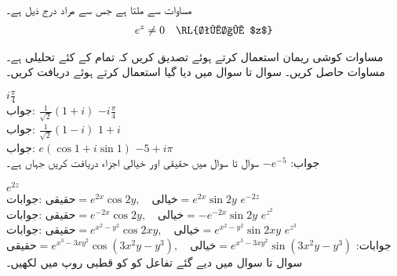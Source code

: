 مساوات  سے  ملتا ہے جس سے مراد درج ذیل ہے۔
\begin{align}
e^z\ne 0\quad \text{\RL{تمام $z$}}
\end{align}

\quad
مساوات کوشی ریمان استعمال کرتے ہوئے تصدیق کریں کہ  تمام  کے کئے تحلیلی ہے۔
\quad
مساوات  حاصل کریں۔
سوال  تا سوال  میں دیا گیا  استعمال کرتے ہوئے   دریافت کریں۔

\quad
$i\tfrac{\pi}{4}$\\
جواب:\quad
$\tfrac{1}{\sqrt{2}}(1+i)$
\quad
$-i\tfrac{\pi}{4}$\\
جواب:\quad
$\tfrac{1}{\sqrt{2}}(1-i)$
\quad
$1+i$\\
جواب:\quad
$e(\cos 1+i\sin 1)$
\quad
$-5+i\pi$\\
جواب:\quad
$-e^{-5}$
سوال  تا سوال  میں حقیقی اور خیالی اجزاء دریافت کریں جہاں  ہے۔

\quad
$e^{2z}$\\
جوابات:\quad
$\text{حقیقی}=e^{2x}\cos 2y,\quad \text{خیالی}=e^{2x}\sin 2y$
\quad
$e^{-2z}$\\
جوابات:\quad
$\text{حقیقی}=e^{-2x}\cos 2y,\quad \text{خیالی}=-e^{-2x}\sin 2y$
\quad
$e^{z^2}$\\
جوابات:\quad
$\text{حقیقی}=e^{x^2-y^2}\cos 2xy,\quad \text{خیالی}=e^{x^2-y^2}\sin 2xy$
\quad
$e^{z^3}$\\
جوابات:\quad
$\text{حقیقی}=e^{x^3-3xy^2}\cos (3x^2y-y^3),\quad \text{خیالی}=e^{x^3-3xy^2}\sin (3x^2y-y^3)$
سوال  تا سوال  میں دیے گئے تفاعل کو  کو قطبی روپ میں لکھیں۔

